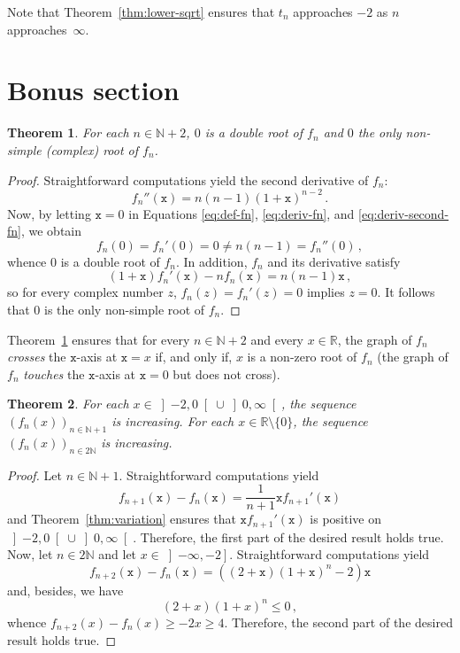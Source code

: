 \documentclass[12pt]{article}
\newcommand{\bR}{\mathbb{R}}
\newcommand{\bN}{\mathbb{N}}
\newcommand{\gtint}[1]{\left] #1, \infty \right[}
\newcommand{\leint}[1]{\left]- \infty, #1 \right]}
\newcommand{\ttx}{\mathtt{x}}
\newtheorem{theorem}{Theorem}
\begin{document}
Note that Theorem~\ref{thm:lower-sqrt} ensures that $t_n$ approaches $- 2$ as $n$ approaches~$\infty$.


 
 

 \section{Bonus section}
 
\begin{theorem} \label{thm:root-mult}
  For each $n \in \bN + 2$,
  $0$ is a double root of $f_n$ and $0$ the only non-simple (complex) root of $f_n$.
\end{theorem}

\begin{proof}
  Straightforward computations yield the second derivative of $f_n$:
\begin{equation} \label{eq:deriv-second-fn}
f_n''(\ttx)  = n (n - 1) {(1 + \ttx)}^{n - 2} \, .
\end{equation}
  Now, by letting $\ttx = 0$ in Equations \eqref{eq:def-fn}, \eqref{eq:deriv-fn}, and \eqref{eq:deriv-second-fn},
  we obtain 
  $$
  f_n(0) = f_n'(0) = 0 \ne n (n - 1) = f_n''(0) \, ,
  $$
  whence $0$ is a double root of $f_n$.
  In addition, $f_n$ and its derivative satisfy 
   $$
   (1 + \ttx) f_n'(\ttx) - n f_n(\ttx) = n (n - 1) \ttx \, ,
   $$
   so for every complex number $z$, $f_n(z) = f_n'(z) = 0$ implies $z = 0$.
   It follows that $0$ is the only non-simple root of $f_n$.
 \end{proof}
 
 Theorem~\ref{thm:root-mult} ensures that
for every $n \in \bN + 2$ and every $x \in \bR$, 
the graph of $f_n$ \emph{crosses} the $\ttx$-axis at $\ttx = x$ if, and only if, $x$ is a non-zero root of $f_n$
(the graph of $f_n$ \emph{touches} the $\ttx$-axis at $\ttx = 0$ but does not cross).

\begin{theorem} \label{thm:increasing-fn}
  For each $x \in \left]- 2, 0 \right[ \cup \gtint{0}$,
  the sequence $\left( f_n(x) \right)_{n \in \bN + 1}$ is increasing.
  For each $x \in \bR \setminus \{ 0 \}$,
  the sequence $\left( f_n(x)\right)_{n \in 2 \bN}$ is increasing.
\end{theorem} 

\begin{proof}
 Let $n \in \bN + 1$.
 Straightforward computations yield  
 $$
 f_{n+ 1} (\ttx) - f_n(\ttx) = \frac{1}{n + 1} \ttx  f_{n + 1}'(\ttx) 
 $$
 and
 Theorem~\ref{thm:variation} ensures that $\ttx f_{n + 1}'(\ttx)$ is positive on $\left]- 2, 0 \right[ \cup \gtint{0}$.
 Therefore, the first part of the desired result holds true.
 Now, let $n \in 2 \bN$ and let $x \in \leint{-2}$.
 Straightforward computations yield  
 $$
 f_{n + 2}(\ttx) - f_n(\ttx) =  \left(  (2 + \ttx) {(1 + \ttx)}^n - 2 \right) \ttx
 $$
 and, besides, we have
 $$
  (2 + x) {(1 + x)}^n \le 0 \,, 
 $$
 whence $f_{n + 2}(x) - f_n(x) \ge - 2 x   \ge 4$.
 Therefore, the second part of the desired result holds true.
\end{proof} 
\end{document}
